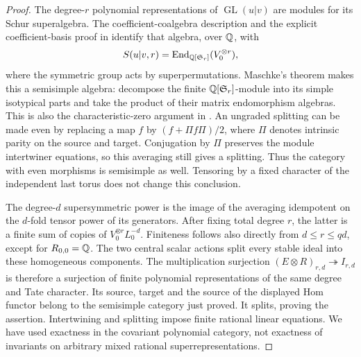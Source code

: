 \begin{proof}
The degree-$r$ polynomial representations of
$\operatorname{GL}(u|v)$ are modules for its Schur superalgebra.
The coefficient-coalgebra description and the explicit
coefficient-basis proof in
\citet[section~5, (5.2), Lemma~5.1 and Theorem~5.2,
author pp.~13--15]{c_brundankujawa2003}
identify that algebra, over $\mathbb Q$, with
\[
 S(u|v,r)=\operatorname{End}_{\mathbb Q[\mathfrak S_r]}(V_0^{\otimes r}),
\]
where the symmetric group acts by superpermutations.
Maschke's theorem makes this a semisimple algebra: decompose the
finite $\mathbb Q[\mathfrak S_r]$-module into its simple isotypical
parts and take the product of their matrix endomorphism algebras.
This is also the characteristic-zero argument in
\citet[Theorem~1.3.1(a)(i), proof of Theorem~4.2.6(a),
author pp.~3 and~12]{c_hemmerkujawanakano2006}.
An ungraded splitting can be made even by replacing a map $f$
by $(f+\Pi f\Pi)/2$, where $\Pi$ denotes intrinsic parity on the
source and target.  Conjugation by $\Pi$ preserves the module
intertwiner equations, so this averaging still gives a splitting.
Thus the category with even morphisms is semisimple as well.
Tensoring by a fixed character of the independent last torus does
not change this conclusion.

The degree-$d$ supersymmetric power is the image of the averaging
idempotent on the $d$-fold tensor power of its generators.  After
fixing total degree $r$, the latter is a finite sum of copies of
$V_0^{\otimes r}L_0^{-d}$.  Finiteness follows also directly from
$d\leq r\leq qd$, except for $R_{0,0}=\mathbb Q$.
The two central scalar actions split every stable ideal into
these homogeneous components.  The multiplication surjection
$(E\otimes R)_{r,d}\twoheadrightarrow I_{r,d}$ is therefore a
surjection of finite polynomial representations of the same
degree and Tate character.  Its source, target and the source of
the displayed Hom functor belong to the semisimple category just
proved.  It splits, proving the assertion.  Intertwining and
splitting impose finite rational linear equations.  We have used
exactness in the covariant polynomial category, not exactness of
invariants on arbitrary mixed rational superrepresentations.
\end{proof}

